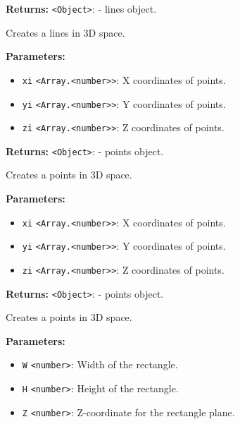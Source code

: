 \documentclass[12pt,a4paper]{article}
\begin{document}
\noindent \textbf{Returns:} \texttt{<Object>}: - lines object.

\noindent Creates a lines in 3D space.

\vspace{5mm}
\noindent {}


\noindent \textbf{Parameters:}
\begin{itemize}
  \item \texttt{xi} \texttt{<Array.<number>>}: X coordinates of points.
  \item \texttt{yi} \texttt{<Array.<number>>}: Y coordinates of points.
  \item \texttt{zi} \texttt{<Array.<number>>}: Z coordinates of points.
\end{itemize}

\noindent \textbf{Returns:} \texttt{<Object>}: - points object.

\noindent Creates a points in 3D space.

\vspace{5mm}
\noindent {}


\noindent \textbf{Parameters:}
\begin{itemize}
  \item \texttt{xi} \texttt{<Array.<number>>}: X coordinates of points.
  \item \texttt{yi} \texttt{<Array.<number>>}: Y coordinates of points.
  \item \texttt{zi} \texttt{<Array.<number>>}: Z coordinates of points.
\end{itemize}

\noindent \textbf{Returns:} \texttt{<Object>}: - points object.

\noindent Creates a points in 3D space.

\vspace{5mm}
\noindent {}


\noindent \textbf{Parameters:}
\begin{itemize}
  \item \texttt{W} \texttt{<number>}: Width of the rectangle.
  \item \texttt{H} \texttt{<number>}: Height of the rectangle.
  \item \texttt{Z} \texttt{<number>}: Z-coordinate for the rectangle plane.
\end{itemize}
\end{document}
